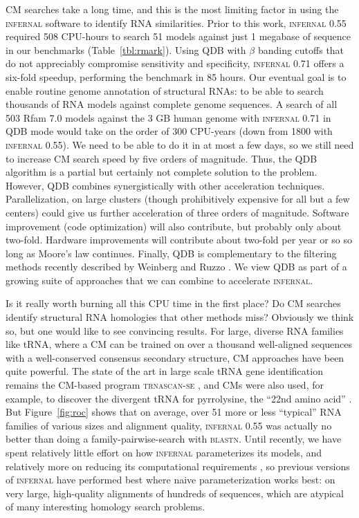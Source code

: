 \documentclass[11pt]{article}
\begin{document}
CM searches take a long time, and this is the most limiting factor in
using the \textsc{infernal} software to identify RNA similarities.
Prior to this work, \textsc{infernal} 0.55 required 508 CPU-hours to
search 51 models against just 1 megabase of sequence in our benchmarks
(Table~\ref{tbl:rmark}).  Using QDB with $\beta$ banding cutoffs that
do not appreciably compromise sensitivity and specificity,
\textsc{infernal} 0.71 offers a six-fold speedup, performing the
benchmark in 85 hours.  Our eventual goal is to enable routine genome
annotation of structural RNAs: to be able to search thousands of RNA
models against complete genome sequences.  A search of all 503 Rfam
7.0 models against the 3 GB human genome with \textsc{infernal} 0.71
in QDB mode would take on the order of 300 CPU-years (down from 1800
with \textsc{infernal} 0.55).  We need to be able to do it in at most
a few days, so we still need to increase CM search speed by five
orders of magnitude.  Thus, the QDB algorithm is a partial but
certainly not complete solution to the problem. However, QDB combines
synergistically with other acceleration techniques. Parallelization,
on large clusters (though prohibitively expensive for all but a few
centers) could give us further acceleration of three orders of
magnitude.  Software improvement (code optimization) will also
contribute, but probably only about two-fold.  Hardware improvements
will contribute about two-fold per year or so so long as Moore's law
continues. Finally, QDB is complementary to the filtering methods
recently described by Weinberg and Ruzzo
\cite{WeinbergRuzzo04,WeinbergRuzzo04b,WeinbergRuzzo06}. We view QDB
as part of a growing suite of approaches that we can combine to
accelerate \textsc{infernal}.

Is it really worth burning all this CPU time in the first place?  Do
CM searches identify structural RNA homologies that other methods
miss? Obviously we think so, but one would like to see convincing
results. For large, diverse RNA families like tRNA, where a CM can be
trained on over a thousand well-aligned sequences with a
well-conserved consensus secondary structure, CM approaches have been
quite powerful. The state of the art in large scale tRNA gene
identification remains the CM-based program \textsc{trnascan-se}
\cite{LoweEddy97}, and CMs were also used, for example, to discover
the divergent tRNA for pyrrolysine, the ``22nd amino acid''
\cite{Srinivasan02}. But Figure~\ref{fig:roc} shows that on average,
over 51 more or less ``typical'' RNA families of various sizes and
alignment quality, \textsc{infernal} 0.55 was actually no better than
doing a family-pairwise-search with \textsc{blastn}.  Until recently,
we have spent relatively little effort on how \textsc{infernal}
parameterizes its models, and relatively more on reducing its
computational requirements \cite{Eddy02b}, so previous versions of
\textsc{infernal} have performed best where naive parameterization
works best: on very large, high-quality alignments of hundreds of
sequences, which are atypical of many interesting homology search
problems.
\end{document}
